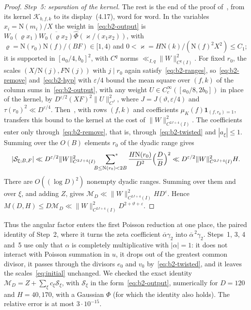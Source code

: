 \documentclass[11pt]{article}
\numberwithin{equation}{section}
\newcommand{\N}{\mathrm N}
\newcommand{\muk}{\mu_K}
\newcommand{\ind}{\mathbf1}
\newcommand{\ssum}{\sideset{}{^*}\sum}
\begin{document}
\begin{proof}
\emph{Step~5: separation of the kernel.} The rest is the end of the proof
of~\cite[Proposition~4.5]{OAI1112}, from its kernel $\mathcal K_{b,f,k}$ to its
display~(4.17), word for word. In the variables $x_i=\N(m_i)/X$ the weight
in~\eqref{eq:b2-output} is
$W_0(\varrho x_1)\overline{W_0(\varrho x_2)}\widehat\Phi(\varkappa/(x_1x_2))$, with
$\varrho=\N(r_0)\N(f)/(BF)\in[1,4)$ and $0<\varkappa=H\N(k)/(\N(f)^2X^2)\le C_1$; it is supported in
$[a_0/4,b_0]^2$, with $C^q$ norms $\ll_{I,q}\|W\|_{C^q(I)}^2$. For fixed $r_0$, the
scales $(X/\N(j),F\N(j))$ with $j\mid r_0$ again satisfy~\eqref{eq:b2-ranges}, so~\eqref{eq:b2-remove}
and~\eqref{eq:b2-hyp} with $\varepsilon/4$ bound the mean square over $(f,k)$ of the column
sums in~\eqref{eq:b2-output}, with any weight $U\in C_c^\infty([a_0/8,2b_0])$ in place of
the kernel, by $D^{\varepsilon/2}(XF)^2\|U\|_{C^J}^2$, where $J=J(\vartheta,\varepsilon/4)$
and $\tau(r_0)^2\ll D^{\varepsilon/4}$. Then~\cite[Lemma~B.2]{OAI1112}, with rows $(f,k)$
and coefficients $\muk(f)\ind_{(f,r_0)=1}$, transfers this bound to the kernel at the cost
of $\|W\|_{C^{2J+4}(I)}^2$. The coefficients enter only through~\eqref{eq:b2-remove}, that
is, through~\eqref{eq:b2-twisted} and $|a_\xi|\le1$. Summing over the $O(B)$ elements $r_0$
of the dyadic range gives
\begin{equation}\label{eq:d052}
 |\mathcal S_{\xi;B,F}|\ll D^{\varepsilon/2}\|W\|_{C^{2J+4}(I)}^2
 \ssum_{B\le\N(r_0)<2B}\frac{H\N(r_0)}{D^2}\Bigl(\frac DB\Bigr)^2
 \ll D^{\varepsilon/2}\|W\|_{C^{2J+4}(I)}^2H .
\end{equation}
There are $O((\log D)^2)$ nonempty dyadic ranges. Summing over them and over $\xi$, and adding
$Z$, gives $\mathcal M_D\ll\|W\|_{C^{2J+4}(I)}^2HD^\varepsilon$. Hence
$M(D,H)\le D\mathcal M_D\ll\|W\|_{C^{2J+4}(I)}^2D^{2+\vartheta+\varepsilon}$.
\end{proof}

Thus the angular factor enters the first Poisson reduction at one place, the paired identity
of Step~2, where it turns the zeta coefficient $\overline\alpha\gamma_2$ into
$\overline\alpha^{\,2}\gamma_2$. Steps~1, 3, 4 and~5 use only that $\alpha$ is completely
multiplicative with $|\alpha|=1$: it does not interact with Poisson summation in $u$, it
drops out of the greatest common divisor, it passes through the divisors $e_0$ and $v_0$
by~\eqref{eq:b2-twisted}, and it leaves the scales~\eqref{eq:initial} unchanged.
We checked the exact identity $\mathcal M_D=Z+\sum_\xi c_\xi\mathcal S_\xi$, with
$\mathcal S_\xi$ in the form~\eqref{eq:b2-output}, numerically for $D=120$ and $H=40,170$,
with a Gaussian $\Phi$ (for which the identity also holds). The relative error is at most
$3\cdot10^{-15}$.
\end{document}

